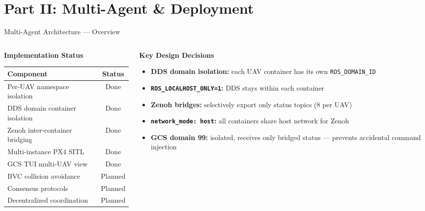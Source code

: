 \documentclass[aspectratio=169, 10pt]{beamer}
\begin{document}
\section{Part II: Multi-Agent \& Deployment}

\begin{frame}{Multi-Agent Architecture --- Overview}
\begin{columns}[T]
\begin{column}{0.45\textwidth}
\textbf{Implementation Status}

\vspace{0.3em}
\small
\begin{tabular}{@{}lc@{}}
\toprule
\textbf{Component} & \textbf{Status} \\
\midrule
Per-UAV namespace isolation & \alert{Done} \\
DDS domain container isolation & \alert{Done} \\
Zenoh inter-container bridging & \alert{Done} \\
Multi-instance PX4 SITL & \alert{Done} \\
GCS TUI multi-UAV view & \alert{Done} \\
BVC collision avoidance & Planned \\
Consensus protocols & Planned \\
Decentralized coordination & Planned \\
\bottomrule
\end{tabular}
\end{column}
\begin{column}{0.52\textwidth}
\textbf{Key Design Decisions}
\begin{itemize}\small
  \item \textbf{DDS domain isolation:} each UAV container has its own \texttt{ROS\_DOMAIN\_ID}
  \item \textbf{\texttt{ROS\_LOCALHOST\_ONLY=1}:} DDS stays within each container
  \item \textbf{Zenoh bridges:} selectively export only status topics (8 per UAV)
  \item \textbf{\texttt{network\_mode: host}:} all containers share host network for Zenoh
  \item \textbf{GCS domain 99:} isolated, receives only bridged status --- prevents accidental command injection
\end{itemize}
\end{column}
\end{columns}
\end{frame}
\end{document}
